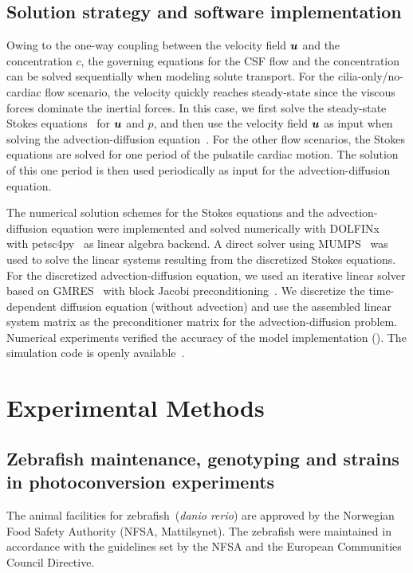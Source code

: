 \documentclass{WileyMSP-template}
\begin{document}
\subsection{Solution strategy and software implementation}
Owing to the one-way coupling between the velocity field $\bm{u}$
and the concentration $c$, the governing equations for the
CSF flow and the concentration can be solved sequentially when modeling solute transport.
For the cilia-only/no-cardiac flow scenario, the velocity quickly reaches steady-state since
the viscous forces dominate the inertial forces.
In this case, we first solve the steady-state Stokes equations~
for $\bm{u}$ and $p$, and then use the velocity field $\bm{u}$ as input when solving
the advection-diffusion equation~.
For the other flow scenarios, the Stokes equations are solved for one
period of the pulsatile cardiac motion. The solution of this one period
is then used periodically as input for the advection-diffusion equation.

The numerical solution schemes for the Stokes equations and the
advection-diffusion equation were implemented and solved numerically with
DOLFINx~\cite{dolfinx2023preprint} with petsc4py~\cite{Dalcin2011ParallelPython}
as linear algebra backend.
A direct solver using MUMPS~\cite{Amestoy2011Mumps} was used to solve the
linear systems resulting from the discretized Stokes equations.
For the discretized advection-diffusion equation, we used an iterative
linear solver based on GMRES~\cite{Saad1986GMRES:Systems} with block Jacobi
preconditioning~\cite{Jacobi1845UeberGleichungen}. We discretize the time-dependent 
diffusion equation (without advection) and use the assembled linear system matrix
as the preconditioner matrix for the advection-diffusion problem.
Numerical experiments verified the accuracy of the model implementation
(). The simulation code is openly
available~\cite{zenodo-link-to-all-code}. 

\section{Experimental Methods}
\subsection{Zebrafish maintenance, genotyping and strains in photoconversion experiments}
The animal facilities for zebrafish~(\emph{danio rerio}) are approved by the
Norwegian Food Safety Authority (NFSA, Mattilsynet).
The zebrafish were maintained in accordance with the guidelines set by the
NFSA and the European Communities Council Directive.
\end{document}

